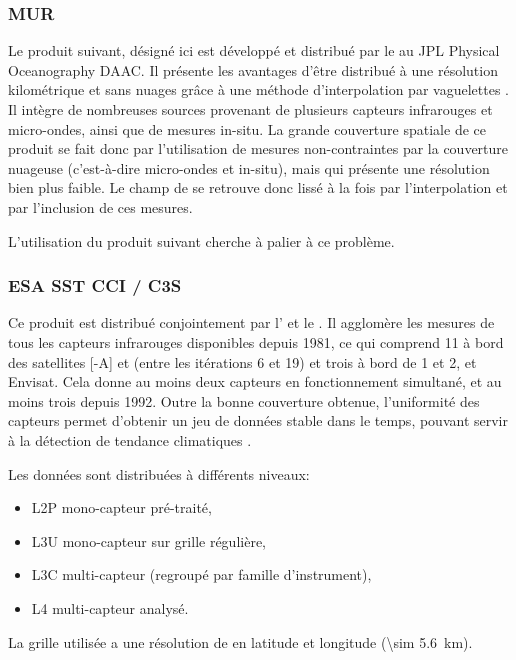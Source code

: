 \documentclass[index]{subfiles}
\begin{document}
\subsubsection{MUR}
\label{sec:donnees-sst-mur}

Le produit suivant, désigné ici  est développé et distribué par le  au JPL Physical Oceanography DAAC.
Il présente les avantages d'être distribué à une résolution kilométrique et sans nuages grâce à une méthode d'interpolation par vaguelettes \parencite{chin_2017}.
Il intègre de nombreuses sources provenant de plusieurs capteurs infrarouges et micro-ondes, ainsi que de mesures in-situ.
La grande couverture spatiale de ce produit se fait donc par l'utilisation de mesures non-contraintes par la couverture nuageuse (c'est-à-dire micro-ondes et in-situ), mais qui présente une résolution bien plus faible.
Le champ de  se retrouve donc lissé à la fois par l'interpolation et par l'inclusion de ces mesures.

L'utilisation du produit suivant cherche à palier à ce problème.

\subsubsection{ESA SST CCI / C3S}
\label{sec:donnees-sst-esacci}

Ce produit est distribué conjointement par l'   et le .
Il agglomère les mesures de tous les capteurs infrarouges disponibles depuis 1981, ce qui comprend 11  à bord des satellites [-A] et  (entre les itérations 6 et 19) et trois  à bord de  1 et 2, et Envisat.
Cela donne au moins deux capteurs en fonctionnement simultané, et au moins trois depuis 1992.
Outre la bonne couverture obtenue, l'uniformité des capteurs permet d'obtenir un jeu de données stable dans le temps, pouvant servir à la détection de tendance climatiques \parencite{merchant_2019}.

Les données sont distribuées à différents niveaux:
\begin{itemize}
  \item L2P mono-capteur pré-traité,
  \item L3U mono-capteur sur grille régulière,
  \item L3C multi-capteur (regroupé par famille d'instrument),
  \item L4 multi-capteur analysé.
\end{itemize}
La grille utilisée a une résolution de  en latitude et longitude (\qty{\sim 5.6}{\km}).
\end{document}

